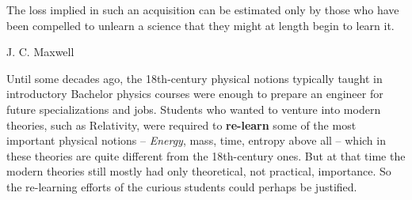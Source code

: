 \iffalse
\newpage
{}
\label{sec:intro}

\epigraph{The loss implied in such an acquisition can be estimated only by those who have been compelled to unlearn a science that they might at length begin to learn it.}{J. C. Maxwell \cites*{maxwell1878}}



Until some decades ago, the 18th-century physical notions typically taught in introductory Bachelor physics courses were enough to prepare an engineer for future specializations and jobs. Students who wanted to venture into modern theories, such as Relativity, were required to \textbf{re-learn} some of the most important physical notions -- \emph{Energy}, mass, time, entropy above all -- which in these theories are quite different from the 18th-century ones. But at that time the modern theories  still mostly had only theoretical, not practical, importance. So the re-learning efforts of the curious students could perhaps be justified.


\smallskip



